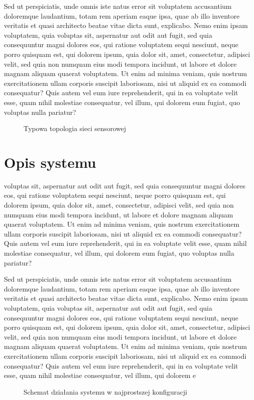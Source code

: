 \documentclass{mgr}
\begin{document}
Sed ut perspiciatis, unde omnis iste natus error sit voluptatem accusantium doloremque laudantium, totam rem aperiam eaque ipsa, quae ab illo inventore veritatis et quasi architecto beatae vitae dicta sunt, explicabo. Nemo enim ipsam voluptatem, quia voluptas sit, aspernatur aut odit aut fugit, sed quia consequuntur magni dolores eos, qui ratione voluptatem sequi nesciunt, neque porro quisquam est, qui dolorem ipsum, quia dolor sit, amet, consectetur, adipisci velit, sed quia non numquam eius modi tempora incidunt, ut labore et dolore magnam aliquam quaerat voluptatem. Ut enim ad minima veniam, quis nostrum exercitationem ullam corporis suscipit laboriosam, nisi ut aliquid ex ea commodi consequatur? Quis autem vel eum iure reprehenderit, qui in ea voluptate velit esse, quam nihil molestiae consequatur, vel illum, qui dolorem eum fugiat, quo voluptas nulla pariatur?
\begin{figure}
\centering
\caption{Typowa topologia sieci sensorowej}
\label{fig:sens}
\end{figure}
\chapter{Opis systemu}
voluptas sit, aspernatur aut odit aut fugit, sed quia consequuntur magni dolores eos, qui ratione voluptatem sequi nesciunt, neque porro quisquam est, qui dolorem ipsum, quia dolor sit, amet, consectetur, adipisci velit, sed quia non numquam eius modi tempora incidunt, ut labore et dolore magnam aliquam quaerat voluptatem. Ut enim ad minima veniam, quis nostrum exercitationem ullam corporis suscipit laboriosam, nisi ut aliquid ex ea commodi consequatur? Quis autem vel eum iure reprehenderit, qui in ea voluptate velit esse, quam nihil molestiae consequatur, vel illum, qui dolorem eum fugiat, quo voluptas nulla pariatur?

Sed ut perspiciatis, unde omnis iste natus error sit voluptatem accusantium doloremque laudantium, totam rem aperiam eaque ipsa, quae ab illo inventore veritatis et quasi architecto beatae vitae dicta sunt, explicabo. Nemo enim ipsam voluptatem, quia voluptas sit, aspernatur aut odit aut fugit, sed quia consequuntur magni dolores eos, qui ratione voluptatem sequi nesciunt, neque porro quisquam est, qui dolorem ipsum, quia dolor sit, amet, consectetur, adipisci velit, sed quia non numquam eius modi tempora incidunt, ut labore et dolore magnam aliquam quaerat voluptatem. Ut enim ad minima veniam, quis nostrum exercitationem ullam corporis suscipit laboriosam, nisi ut aliquid ex ea commodi consequatur? Quis autem vel eum iure reprehenderit, qui in ea voluptate velit esse, quam nihil molestiae consequatur, vel illum, qui dolorem e
\label{chap:opis}
\begin{figure}
\centering
\caption{Schemat działania systemu w najprostszej konfiguracji}
\label{fig:calosc}
\end{figure}
\end{document}
